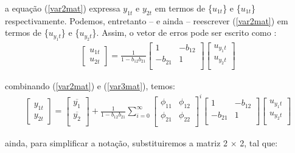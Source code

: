 \noindent
a equação (\ref{var2mat}) expressa $y_{1t}$ e $y_{2t}$ em termos de \{$u_{1t}$\} e \{$u_{1t}$\} respectivamente. Podemos, entretanto -- e ainda -- reescrever (\ref{var2mat}) em termos de \{$u_{y_1t}$\} e \{$u_{y_2t}$\}. Assim, o vetor de erros pode ser escrito como \cite{enders2008applied}:
\begin{align} \label{var3mat}
\begin{bmatrix}
    u_{1t} \\
    u_{2t}
\end{bmatrix}
= \frac{1}{1 - b_{12}b_{21}}
\begin{bmatrix}
    1 & -b_{12} \\
    -b_{21} & 1 \\
\end{bmatrix}
\begin{bmatrix}
    u_{y_1t} \\
    u_{y_2t}\\
\end{bmatrix}
\end{align}

\noindent
combinando (\ref{var2mat}) e (\ref{var3mat}), temos:
\begin{align*} 
\begin{bmatrix}
    y_{1t} \\
    y_{2t}
\end{bmatrix}
=
\begin{bmatrix}
    \overline{y_1} \\
    \overline{y_2} \\
\end{bmatrix}
+ \frac{1}{1 - b_{12}b_{21}} \sum_{i=0}^{\infty}
\begin{bmatrix}
    \phi_{11} & \phi_{12} \\
    \phi_{21} & \phi_{22}\\
\end{bmatrix}^i
\begin{bmatrix}
    1 & -b_{12} \\
    -b_{21} & 1 \\
\end{bmatrix}
\begin{bmatrix}
    u_{y_1t} \\
    u_{y_2t}\\
\end{bmatrix}
\end{align*}

\noindent
ainda, para simplificar a notação, substituiremos a matriz 2 $\times$ 2, tal que:

